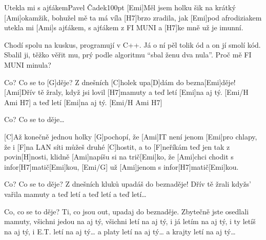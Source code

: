 \begin{song}{Utekla mi s ajťákem}{Pavel Čadek}{100pt}
%
[Emi]Měl jsem holku šik na krátký [Ami]okamžik,
bohužel mě ta má víla [H7]brzo zradila,
jak [Emi]pod afrodiziakem utekla mi [Ami]s ajťákem,
s ajťákem z FI MUNI a [H7]ke mně už je imunní.

%
Chodí spolu na kuskus, programují v C++.
Já o ní pěl tolik ód a on jí smolí kód.
Sbalil ji, těžko věřit mu, prý podle algoritmu
``sbal ženu dva nula''. Proč mě FI MUNI minula?

\chorus%
[C]Co? Co se to [G]děje?
Z dnešních [C]holek upa[D]dám do bezna[Emi]děje!
[Ami]Dřív tě žraly, když jsi lovil [H7]mamuty
a teď letí [Emi]na aj tý. [Emi/H Ami H7]{}
a teď letí [Emi]na aj tý. [Emi/H Ami H7]{}



\chorus Co? Co se to děje\dots
\pagebreak


\verse{*}%
[C]Až konečně jednou holky [G]pochopí,
že [Ami]IT není jenom [Emi]pro chlapy,
že i [F]na LAN síti můžeš druhé [C]hostit,
a to [F]neříkám teď jen tak z povin[H]nosti,
klidně [Ami]napíšu si na trič[Emi]ko,
že [Ami]chci chodit s infor[H7]matič[Emi]kou, [Emi/G]{}
už [Ami]jenom s infor[H7]matič[Emi]kou.

\chorus%
Co? Co se to děje?
Z dnešních kluků upadáš do beznaděje!
Dřív tě žrali kdyžs' vařila mamuty
a teď letí a teď letí a teď letí\dots

\chorus%
Co, co se to děje?
Ti, co jsou out, upadaj do beznaděje.
Zbytečně jste osedlali mamuty,
všichni jedou na aj tý,
všichni letí na aj tý,
i já letím na aj tý,
i ty letíš na aj tý,
i E.T. letí na aj tý\dots
a platy letí na aj tý\dots
a krajty letí na aj tý\dots
\end{song}
